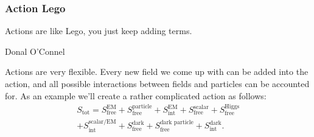 \subsubsection{Action Lego}
\epigraph{Actions are like Lego, you just keep adding terms.}{Donal O'Connel}
Actions are very flexible.
Every new field we come up with can be added into the action, and all possible interactions between fields and particles can be accounted for.
As an example we'll create a rather complicated action as follows:
\begin{multline}
    S_{\text{tot}} = S_{\text{free}}^{\text{EM}} + S_{\text{free}}^{\text{particle}} + S_{\text{int}}^{\text{EM}} + S_{\text{free}}^{\text{scalar}} + S_{\text{free}}^{\text{Higgs}}\\
    + S_{\text{int}}^{\text{scalar/EM}} + S_{\text{free}}^{\text{dark}} + S_{\text{free}}^{\text{dark particle}} + S_{\text{int}}^{\text{dark}}.
\end{multline}

